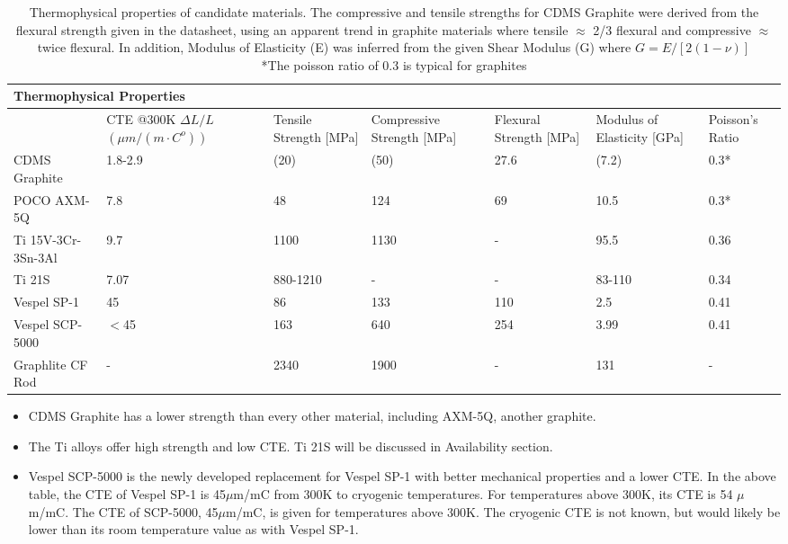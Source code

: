 \documentclass{report}
\begin{document}
\begin{table}[htb]%
\centering
\begin{threeparttable}
{\footnotesize\rm\begin{tabularx}{16.5cm}{llp{1.6cm}p{1.9cm}p{1.6cm}p{1.6cm}l}
\multicolumn{5}{l}{\Large{Thermophysical Properties}}\\
\toprule
& \parbox[t][1cm][t]{2.2cm}{CTE @300K \\ $\Delta L/L$ \\ $(\mu m/(m\cdot C^o))$}
& Tensile Strength [MPa] & Compressive Strength [MPa]
& Flexural Strength [MPa] & Modulus of Elasticity [GPa] & Poisson's Ratio\\
\midrule
 CDMS Graphite & 1.8-2.9  & (20) & (50) & 27.6 & (7.2) & 0.3* \\
 POCO AXM-5Q & 7.8 & 48 & 124 & 69 & 10.5 & 0.3* \\
 Ti 15V-3Cr-3Sn-3Al & 9.7 & 1100 & 1130 & - & 95.5 & 0.36  \\
 Ti 21S & 7.07 & 880-1210 & - & - & 83-110 & 0.34 \\
 Vespel SP-1 & 45 & 86 & 133 & 110 & 2.5 & 0.41 \\
 Vespel SCP-5000 & $<$45 & 163 & 640 & 254 & 3.99 & 0.41 \\
Graphlite CF Rod & - & 2340 & 1900 & - & 131 & - \\
 \bottomrule
\end{tabularx}}

\caption{Thermophysical properties of candidate materials. The compressive and tensile
strengths for CDMS Graphite were derived from the flexural strength given in the datasheet, using an apparent trend in graphite materials where tensile $\approx$ 2/3 flexural and compressive $\approx$ twice flexural. In addition, Modulus of Elasticity (E) was inferred from the given Shear Modulus (G) where $G = E/[2(1-\nu)]$ \\ *The poisson ratio of 0.3 is typical for graphites }
\end{threeparttable}
\end{table}

\begin{itemize}
\item CDMS Graphite has a lower strength than every other material, including AXM-5Q,
another graphite.
\item The Ti alloys offer high strength and low CTE. Ti 21S will be discussed in
Availability section.
\item Vespel SCP-5000 is the newly developed replacement for Vespel SP-1 with better
mechanical properties and a lower CTE. In the above table, the CTE of Vespel SP-1 is
45$\mu$m/mC from 300K to cryogenic temperatures. For temperatures above 300K, its CTE
is 54 $\mu$m/mC. The CTE of SCP-5000, 45$\mu$m/mC, is given for temperatures above 300K.
The cryogenic CTE is not known, but would likely be lower than its room temperature value
as with Vespel SP-1.
\end{itemize}
\end{document}
